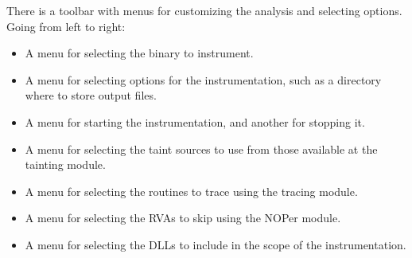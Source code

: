 \documentclass[conference]{IEEEtran}
\begin{document}
There is a toolbar with menus for customizing the analysis and selecting options. Going
from left to right:
\begin{itemize}
    \item A menu for selecting the binary to instrument.
    \item A menu for selecting options for the instrumentation, such as a directory 
    where to store output files.
    \item A menu for starting the instrumentation, and another for stopping it.
    \item A menu for selecting the taint sources to use from those available at the tainting module.
    \item A menu for selecting the routines to trace using the tracing module.
    \item A menu for selecting the RVAs to skip using the NOPer module.
    \item A menu for selecting the DLLs to include in the scope of the instrumentation.
\end{itemize} 
\end{document}

